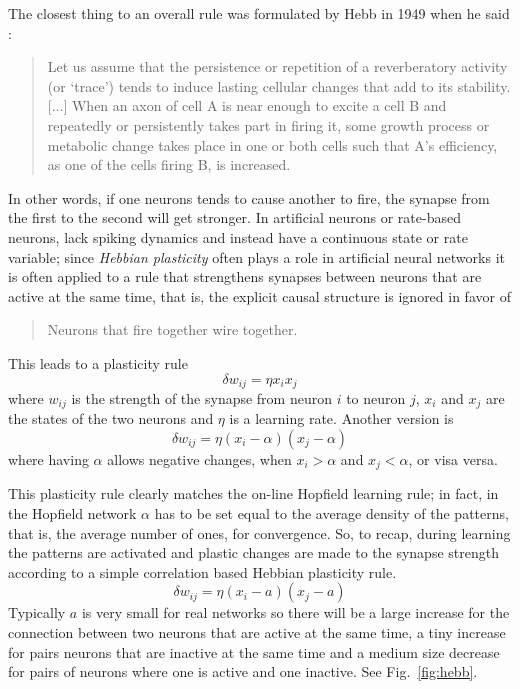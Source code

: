\documentclass[12pt]{article}
\begin{document}
The closest thing to an overall rule was formulated by Hebb in 1949
when he said \cite{Hebb1949a}:
\begin{quote}
Let us assume that the persistence or repetition of a reverberatory
activity (or \lq{}trace\rq{}) tends to induce lasting cellular changes that
add to its stability. [$\ldots$] When an axon of cell A is near enough to excite
a cell B and repeatedly or persistently takes part in firing it, some
growth process or metabolic change takes place in one or both cells
such that A's efficiency, as one of the cells firing B, is increased.
\end{quote}
In other words, if one neurons tends to cause another to fire, the
synapse from the first to the second will get stronger. In artificial
neurons or rate-based neurons, lack spiking dynamics and instead have
a continuous state or rate variable; since \textsl{Hebbian plasticity}
often plays a role in artificial neural networks it is often applied
to a rule that strengthens synapses between neurons that are active at
the same time, that is, the explicit causal structure is ignored in
favor of
\begin{quote}
Neurons that fire together wire together.
\end{quote}
This leads to a plasticity rule 
\begin{equation}
\delta w_{ij}=\eta x_i x_j
\end{equation}
where $w_{ij}$ is the strength of the synapse from neuron $i$ to
neuron $j$, $x_i$ and $x_j$ are the states of the two neurons and
$\eta$ is a learning rate. Another version is
\begin{equation}
\delta w_{ij}=\eta (x_i-\alpha)(x_j-\alpha)
\end{equation}
where having $\alpha$ allows negative changes, when $x_i>\alpha$ and
$x_j<\alpha$, or visa versa.

This plasticity rule clearly matches the on-line Hopfield learning
rule; in fact, in the Hopfield network $\alpha$ has to be set equal to
the average density of the patterns, that is, the average number of
ones, for convergence. So, to recap, during learning the patterns are
activated and plastic changes are made to the synapse strength
according to a simple correlation based Hebbian plasticity rule.
\begin{equation}
\delta w_{ij}=\eta (x_i-a)(x_j-a)
\end{equation}
Typically $a$ is very small for real networks so there will be a large
increase for the connection between two neurons that are active at the
same time, a tiny increase for pairs neurons that are inactive at the
same time and a medium size decrease for pairs of neurons where one is
active and one inactive. See Fig.~\ref{fig:hebb}.
\end{document}
